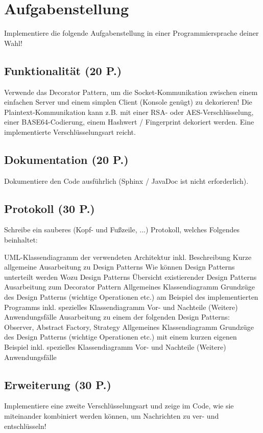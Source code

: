 \section{Aufgabenstellung}
Implementiere die folgende Aufgabenstellung in einer Programmiersprache deiner Wahl!
\subsection{Funktionalität (20 P.)}
Verwende das Decorator Pattern, um die Socket-Kommunikation zwischen einem einfachen Server und einem simplen Client (Konsole genügt) zu dekorieren! Die Plaintext-Kommunikation kann z.B. mit einer RSA- oder AES-Verschlüsselung, einer BASE64-Codierung, einem Hashwert / Fingerprint dekoriert werden. Eine implementierte Verschlüsselungsart reicht.

\subsection{Dokumentation (20 P.)}
Dokumentiere den Code ausführlich (Sphinx / JavaDoc ist nicht erforderlich).

\subsection{Protokoll (30 P.)}
Schreibe ein sauberes (Kopf- und Fußzeile, ...) Protokoll, welches Folgendes beinhaltet:

\begin{outline}
\1 UML-Klassendiagramm der verwendeten Architektur inkl. Beschreibung
    \2 Kurze allgemeine Ausarbeitung zu Design Patterns
    \2 Wie können Design Patterns unterteilt werden
    \2 Wozu Design Patterns
    \2 Übersicht existierender Design Patterns
\1 Ausarbeitung zum Decorator Pattern
    \2 Allgemeines Klassendiagramm
    \2 Grundzüge des Design Patterns (wichtige Operationen etc.) am Beispiel des implementierten Programms inkl. spezielles Klassendiagramm
    \2 Vor- und Nachteile
    \2 (Weitere) Anwendungsfälle
\1 Ausarbeitung zu einem der folgenden Design Patterns: Observer, Abstract Factory, Strategy
    \2 Allgemeines Klassendiagramm
    \2 Grundzüge des Design Patterns (wichtige Operationen etc.) mit einem kurzen eigenen Beispiel inkl. spezielles Klassendiagramm
    \2 Vor- und Nachteile
    \2 (Weitere) Anwendungsfälle
\end{outline}

\subsection{Erweiterung (30 P.)}
Implementiere eine zweite Verschlüsselungsart und zeige im Code, wie sie miteinander kombiniert werden können, um Nachrichten zu ver- und entschlüsseln!
